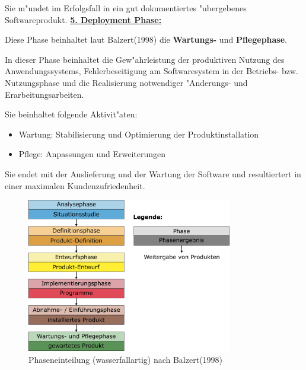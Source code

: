 Sie m"undet im Erfolgsfall in ein gut dokumentiertes "ubergebenes Softwareprodukt.
\bigbreak
\underline{\textbf{5. Deployment Phase:}}
\smallbreak

Diese Phase beinhaltet laut Balzert(1998)\supercite{Balzert1998} die \textbf{Wartungs-} und \textbf{Pflegephase}.

In dieser Phase beinhaltet die Gew"ahrleistung der produktiven Nutzung des Anwendungssystems, Fehlerbeseitigung am Softwaresystem in der Betriebs- bzw. Nutzungsphase und die Realisierung notwendiger "Anderungs- und Erarbeitungsarbeiten.

Sie beinhaltet folgende Aktivit"aten:
\begin{itemize}
  \item Wartung: Stabilisierung und Optimierung der Produktinstallation
  \item Pflege: Anpassungen und Erweiterungen
\end{itemize}

Sie endet mit der Auslieferung und der Wartung der Software und resultiertert in einer maximalen Kundenzufriedenheit.
  \begin{figure}[H]
    \centering
    \includegraphics[width=0.8\textwidth]{./images/AbbPhaseneinteilung.png}
    \captionsetup{name=Abb.,font=footnotesize}
    \caption{Phaseneinteilung (wasserfallartig) nach Balzert(1998)\supercite{Balzert1998}}
  \end{figure}

